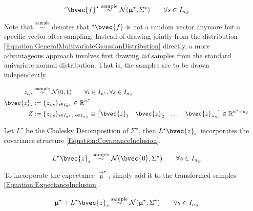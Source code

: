 			\begin{equation}
				{^{s}}\bvec{f}^{\star} \stackrel{\text{sample}}{\sim} \mathcal{N}(\vec{\upmu}^{\star}, \Sigma^{\star}) \qquad \forall s \in I_{n_{S}}
			\label{Equation:GeneralMultivariateGaussianDistribution}
			\end{equation}
			
			Note that $\stackrel{\text{sample}}{\sim}$ denotes that ${^{s}}\bvec{f}$ is not a random vector anymore but a specific vector after sampling. Instead of drawing jointly from the distribution \eqref{Equation:GeneralMultivariateGaussianDistribution} directly, a more advantageous approach involves first drawing \textit{iid} samples from the standard univariate normal distribution. That is, the samples are to be drawn independently.
			
			\begin{equation}
				\begin{aligned}
					z_{i, s} &\stackrel{\text{sample}}{\sim} \mathcal{N}(0, 1) \qquad \forall i \in I_{n^{\star}}, \forall s \in I_{n_{S}} \\
					\bvec{z}_{s} &:= \{z_{i, s}\}_{i \in I_{n^{\star}}} \in \mathbb{R}^{n^{\star}} \\
					Z &:= \{z_{i, s}\}_{i \in I_{n^{\star}}, \; s \in I_{n_{S}}} \equiv \begin{bmatrix} \bvec{z}_{1} & \bvec{z}_{2} & \dots & \bvec{z}_{n_{S}} \end{bmatrix} \in \mathbb{R}^{n^{\star} \times n_{S}}
				\end{aligned}
			\label{Equation:iidGaussianSampling}
			\end{equation}			
			
			Let $L^{\star}$ be the Cholesky Decomposition of $\Sigma^{\star}$, then $L^{\star} \bvec{z}_{s}$ incorporates the covariance structure \eqref{Equation:CovarianceInclusion}.
			
			\begin{equation}
				\begin{aligned}
					L^{\star} \bvec{z}_{s} \stackrel{\text{sample}}{\sim} \mathcal{N}(\bvec{0}, \Sigma^{\star}) \qquad \forall s \in I_{n_{S}}
				\end{aligned}
			\label{Equation:CovarianceInclusion}
			\end{equation}
			
			To incorporate the expectance $\vec{\upmu}^{\star}$, simply add it to the transformed samples \eqref{Equation:ExpectanceInclusion}.
			
			\begin{equation}
				\begin{aligned}
					\vec{\upmu}^{\star} + L^{\star} \bvec{z}_{s} \stackrel{\text{sample}}{\sim} \mathcal{N}(\vec{\upmu}^{\star}, \Sigma^{\star}) \qquad \forall s \in I_{n_{S}}
				\end{aligned}
			\label{Equation:ExpectanceInclusion}
			\end{equation}
			
